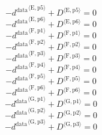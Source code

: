 \begin{equation}
-{d^{\mathrm{data}}}^{\langle \mathrm{\mathrm{E}},\mathrm{\mathrm{p5}}\rangle} + {D}^{\langle \mathrm{E},\mathrm{p5}\rangle} = 0
\end{equation}
\begin{equation}
-{d^{\mathrm{data}}}^{\langle \mathrm{\mathrm{E}},\mathrm{\mathrm{p6}}\rangle} + {D}^{\langle \mathrm{E},\mathrm{p6}\rangle} = 0
\end{equation}
\begin{equation}
-{d^{\mathrm{data}}}^{\langle \mathrm{\mathrm{F}},\mathrm{\mathrm{p1}}\rangle} + {D}^{\langle \mathrm{F},\mathrm{p1}\rangle} = 0
\end{equation}
\begin{equation}
-{d^{\mathrm{data}}}^{\langle \mathrm{\mathrm{F}},\mathrm{\mathrm{p2}}\rangle} + {D}^{\langle \mathrm{F},\mathrm{p2}\rangle} = 0
\end{equation}
\begin{equation}
-{d^{\mathrm{data}}}^{\langle \mathrm{\mathrm{F}},\mathrm{\mathrm{p3}}\rangle} + {D}^{\langle \mathrm{F},\mathrm{p3}\rangle} = 0
\end{equation}
\begin{equation}
-{d^{\mathrm{data}}}^{\langle \mathrm{\mathrm{F}},\mathrm{\mathrm{p4}}\rangle} + {D}^{\langle \mathrm{F},\mathrm{p4}\rangle} = 0
\end{equation}
\begin{equation}
-{d^{\mathrm{data}}}^{\langle \mathrm{\mathrm{F}},\mathrm{\mathrm{p5}}\rangle} + {D}^{\langle \mathrm{F},\mathrm{p5}\rangle} = 0
\end{equation}
\begin{equation}
-{d^{\mathrm{data}}}^{\langle \mathrm{\mathrm{F}},\mathrm{\mathrm{p6}}\rangle} + {D}^{\langle \mathrm{F},\mathrm{p6}\rangle} = 0
\end{equation}
\begin{equation}
-{d^{\mathrm{data}}}^{\langle \mathrm{\mathrm{G}},\mathrm{\mathrm{p1}}\rangle} + {D}^{\langle \mathrm{G},\mathrm{p1}\rangle} = 0
\end{equation}
\begin{equation}
-{d^{\mathrm{data}}}^{\langle \mathrm{\mathrm{G}},\mathrm{\mathrm{p2}}\rangle} + {D}^{\langle \mathrm{G},\mathrm{p2}\rangle} = 0
\end{equation}
\begin{equation}
-{d^{\mathrm{data}}}^{\langle \mathrm{\mathrm{G}},\mathrm{\mathrm{p3}}\rangle} + {D}^{\langle \mathrm{G},\mathrm{p3}\rangle} = 0
\end{equation}
